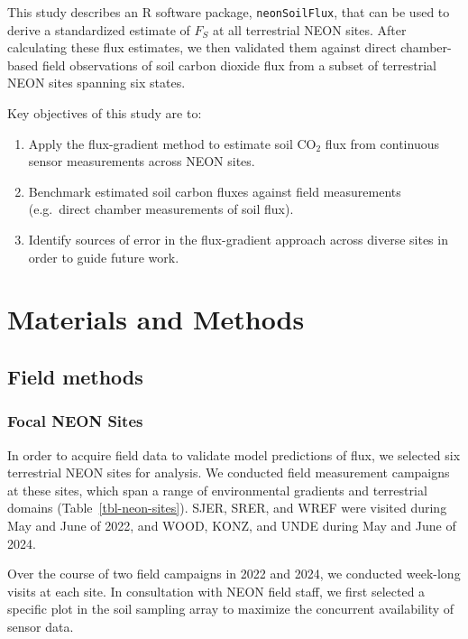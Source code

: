 \documentclass[
  letterpaper,
  DIV=11,
  numbers=noendperiod]{scrartcl}
\providecommand{\tightlist}{%
  \setlength{\itemsep}{0pt}\setlength{\parskip}{0pt}}\usepackage{longtable,booktabs,array}
\begin{document}
This study describes an R software package, \texttt{neonSoilFlux}, that
can be used to derive a standardized estimate of \(F_{S}\) at all
terrestrial NEON sites. After calculating these flux estimates, we then
validated them against direct chamber-based field observations of soil
carbon dioxide flux from a subset of terrestrial NEON sites spanning six
states.

Key objectives of this study are to:

\begin{enumerate}
\def\labelenumi{\arabic{enumi}.}
\tightlist
\item
  Apply the flux-gradient method to estimate soil CO\(_{2}\) flux from
  continuous sensor measurements across NEON sites.
\item
  Benchmark estimated soil carbon fluxes against field measurements
  (e.g.~direct chamber measurements of soil flux).
\item
  Identify sources of error in the flux-gradient approach across diverse
  sites in order to guide future work.
\end{enumerate}

\section{Materials and Methods}\label{materials-and-methods}

\subsection{Field methods}\label{field-methods}

\subsubsection{Focal NEON Sites}\label{focal-neon-sites}

In order to acquire field data to validate model predictions of flux, we
selected six terrestrial NEON sites for analysis. We conducted field
measurement campaigns at these sites, which span a range of
environmental gradients and terrestrial domains
(Table~\ref{tbl-neon-sites}). SJER, SRER, and WREF were visited during
May and June of 2022, and WOOD, KONZ, and UNDE during May and June of
2024.

Over the course of two field campaigns in 2022 and 2024, we conducted
week-long visits at each site. In consultation with NEON field staff, we
first selected a specific plot in the soil sampling array to maximize
the concurrent availability of sensor data.
\end{document}
